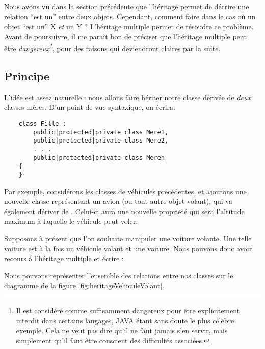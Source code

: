 Nous avons vu dans la section pr\'ec\'edente que l'h\'eritage permet de
d\'ecrire une relation ``est un'' entre deux objets. Cependant, comment faire
dans le cas o\`u un objet ``est un'' X \emph{et} un Y ? L'h\'eritage multiple
permet de r\'esoudre ce probl\`eme. Avant de poursuivre, il me para\^it bon de
pr\'eciser que l'h\'eritage multiple peut \^etre \emph{dangereux\footnote{Il
est consid\'er\'e comme suffisamment dangereux pour \^etre explicitement
interdit dans certains langages, JAVA \'etant sans doute le plus c\'el\`ebre
exemple. Cela ne veut pas dire qu'il ne faut jamais s'en servir, mais
simplement qu'il faut \^etre conscient des difficult\'es associ\'ees.}}, pour
des raisons qui deviendront claires par la suite.

\subsection{Principe}

L'id\'ee est assez naturelle : nous allons faire h\'eriter notre classe
d\'eriv\'ee de \emph{deux} classes m\`eres. D'un point de vue syntaxique, on \'ecrira:

\begin{lstlisting}
	class Fille :
		public|protected|private class Mere1,
		public|protected|private class Mere2,
		. . .
		public|protected|private class Meren
	{
	}		
\end{lstlisting}

Par exemple, consid\'erons les classes de v\'ehicules pr\'ec\'edentes, et
ajoutons une nouvelle classe repr\'esentant un avion (ou tout autre objet
volant), qui va \'egalement d\'eriver de . Celui-ci aura
une nouvelle propri\'et\'e qui sera l'altitude maximum \`a laquelle le v\'ehicule peut voler.


Supposons \`a pr\'esent que l'on souhaite manipuler une voiture volante. Une telle voiture est \`a la fois un v\'ehicule volant et une voiture. Nous pouvons donc avoir recours \`a l'h\'eritage multiple et \'ecrire :


Nous pouvons repr\'esenter l'ensemble des relations entre nos classes sur le
diagramme de la figure \ref{fig:heritageVehiculeVolant}.


